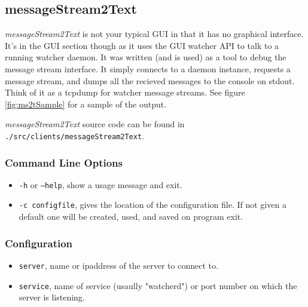 \subsection{messageStream2Text}

{\it messageStream2Text} is not your typical GUI in that it has no graphical interface. It's in the GUI section though as it uses 
the GUI watcher API to talk to a running watcher daemon. It was written (and is used) as a tool to debug the message stream interface. It simply
connects to a daemon instance, requests a message stream, and dumps all the recieved messages to the console on stdout. Think of it as a 
tcpdump for watcher message streams. See figure \ref{fig:ms2tSample} for a sample of the output.

{\it messageStream2Text} source code can be found in {\tt .\slash src\slash clients\slash messageStream2Text}. 

\subsubsection{Command Line Options}

\begin{itemize}
\item {\tt -h} or {\tt --help}, show a usage message and exit. 
\item {\tt -c configfile}, gives the location of the configuration file. If not given a default one will be created, used, and saved on program exit.
\end{itemize}

\subsubsection{Configuration}

\begin{itemize}
\item {\tt server}, name or ipaddress of the server to connect to.
\item {\tt service}, name of service (usaully "watcherd") or port number on which the server is listening.
\end{itemize}

